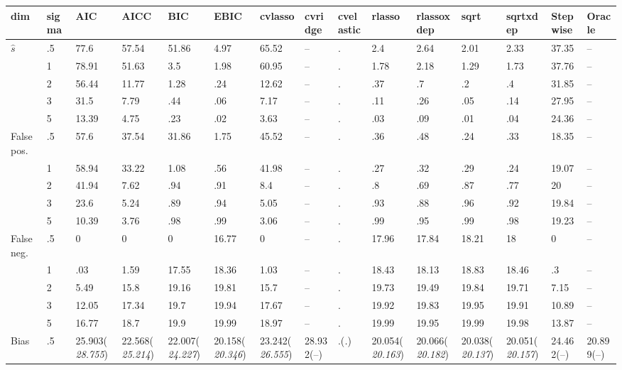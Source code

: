 \documentclass{article}
\begin{document}
\begin{table}[tbp] \centering
{}

{\tiny
\begin{tabularx}{\textwidth}{lCCCCCCCCCCCCCC}

\toprule
{dim}&{sigma}&{AIC}&{AICC}&{BIC}&{EBIC}&{cvlasso}&{cvridge}&{cvelastic}&{rlasso}&{rlassoxdep}&{sqrt}&{sqrtxdep}&{Stepwise}&{Oracle} \tabularnewline
\midrule\addlinespace[1.5ex]
$\hat{s}$&.5&77.6&57.54&51.86&4.97&65.52&--&.&2.4&2.64&2.01&2.33&37.35&-- \tabularnewline
&1&78.91&51.63&3.5&1.98&60.95&--&.&1.78&2.18&1.29&1.73&37.76&-- \tabularnewline
&2&56.44&11.77&1.28&.24&12.62&--&.&.37&.7&.2&.4&31.85&-- \tabularnewline
&3&31.5&7.79&.44&.06&7.17&--&.&.11&.26&.05&.14&27.95&-- \tabularnewline
&5&13.39&4.75&.23&.02&3.63&--&.&.03&.09&.01&.04&24.36&-- \tabularnewline
\midrule False pos.&.5&57.6&37.54&31.86&1.75&45.52&--&.&.36&.48&.24&.33&18.35&-- \tabularnewline
&1&58.94&33.22&1.08&.56&41.98&--&.&.27&.32&.29&.24&19.07&-- \tabularnewline
&2&41.94&7.62&.94&.91&8.4&--&.&.8&.69&.87&.77&20&-- \tabularnewline
&3&23.6&5.24&.89&.94&5.05&--&.&.93&.88&.96&.92&19.84&-- \tabularnewline
&5&10.39&3.76&.98&.99&3.06&--&.&.99&.95&.99&.98&19.23&-- \tabularnewline
\midrule False neg.&.5&0&0&0&16.77&0&--&.&17.96&17.84&18.21&18&0&-- \tabularnewline
&1&.03&1.59&17.55&18.36&1.03&--&.&18.43&18.13&18.83&18.46&.3&-- \tabularnewline
&2&5.49&15.8&19.16&19.81&15.7&--&.&19.73&19.49&19.84&19.71&7.15&-- \tabularnewline
&3&12.05&17.34&19.7&19.94&17.67&--&.&19.92&19.83&19.95&19.91&10.89&-- \tabularnewline
&5&16.77&18.7&19.9&19.99&18.97&--&.&19.99&19.95&19.99&19.98&13.87&-- \tabularnewline
\midrule Bias&.5&25.903\newline (\emph{28.755})&22.568\newline (\emph{25.214})&22.007\newline (\emph{24.227})&20.158\newline (\emph{20.346})&23.242\newline (\emph{26.555})&28.932\newline (--)&.\newline (\emph{.})&20.054\newline (\emph{20.163})&20.066\newline (\emph{20.182})&20.038\newline (\emph{20.137})&20.051\newline (\emph{20.157})&24.462\newline (--)&20.899\newline (--) \tabularnewline

\end{tabularx}}
\end{table}
\end{document}

